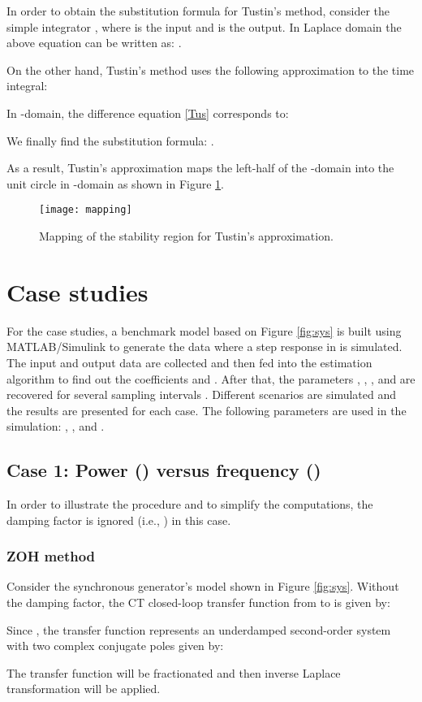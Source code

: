 \documentclass[10pt,journal,final]{IEEEtran}
\begin{document}
In order to {obtain} the {substitution} formula for Tustin's method, consider the simple integrator , where  is the input and  is the output. In Laplace domain the above equation can be written as: .

On the other hand, Tustin's method uses the following approximation to the time integral:

In -domain, the difference equation \eqref{Tus} corresponds to:

We finally find the substitution formula:
.


As a result, Tustin's approximation maps the left-half of the -domain into the unit circle  in -domain as shown in Figure \ref{fig:map}.
\begin{figure}[h!]
\centering
\texttt{[image: mapping]}
\caption{Mapping of the stability region for Tustin's approximation.} \label{fig:map}
\end{figure}
\section{Case studies}\label{Cases}
For the case studies, a {benchmark} model based on Figure \ref{fig:sys} is built using MATLAB/Simulink to generate the data where a step response in  is simulated. The input and output data are collected and then fed into the estimation algorithm to find out the coefficients  and . After that, the parameters , , , and  are recovered for several sampling intervals . Different scenarios are simulated and the results are presented for each case. The following parameters are used in the simulation: , , and .

\subsection{Case 1: Power () versus {frequency} ()}
In order to illustrate the procedure and to simplify the computations, the damping factor is ignored (i.e., ) in this case.
\subsubsection{ZOH method}
Consider the synchronous generator's model shown in Figure \ref{fig:sys}. Without the damping factor, the CT closed-loop transfer function from  to  is given by:

Since , the transfer function represents an underdamped second-order system with two complex conjugate poles given by:


The transfer function  will be fractionated and then inverse Laplace transformation will be applied.
\end{document}
